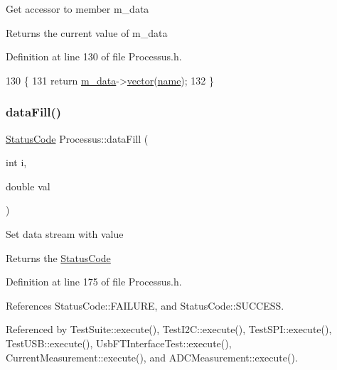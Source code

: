 Get accessor to member m\+\_\+data \begin{DoxyReturn}{Returns}
the current value of m\+\_\+data 
\end{DoxyReturn}


Definition at line 130 of file Processus.\+h.


\begin{DoxyCode}
130                                         \{
131     \textcolor{keywordflow}{return} \hyperlink{classProcessus_a3da9a9de8af54e2f47807a3e09dfccff}{m\_data}->\hyperlink{classData_a94e00cdd58c1d6f11487f1ac47fee4bc}{vector}(\hyperlink{classObject_a300f4c05dd468c7bb8b3c968868443c1}{name});
132   \}
\end{DoxyCode}
\mbox{\label{classProcessus_a0d093b48f3218a088ba030e24372f18c}} 
\subsubsection{\texorpdfstring{data\+Fill()}{dataFill()}\hspace{0.1cm}{\footnotesize\ttfamily [1/2]}}
{\footnotesize\ttfamily \hyperlink{classStatusCode}{Status\+Code} Processus\+::data\+Fill (\begin{DoxyParamCaption}\item[{int}]{i,  }\item[{double}]{val }\end{DoxyParamCaption})\hspace{0.3cm}{\ttfamily [inline]}}

Set data stream with value \begin{DoxyReturn}{Returns}
the \hyperlink{classStatusCode}{Status\+Code} 
\end{DoxyReturn}


Definition at line 175 of file Processus.\+h.



References Status\+Code\+::\+F\+A\+I\+L\+U\+RE, and Status\+Code\+::\+S\+U\+C\+C\+E\+SS.



Referenced by Test\+Suite\+::execute(), Test\+I2\+C\+::execute(), Test\+S\+P\+I\+::execute(), Test\+U\+S\+B\+::execute(), Usb\+F\+T\+Interface\+Test\+::execute(), Current\+Measurement\+::execute(), and A\+D\+C\+Measurement\+::execute().


